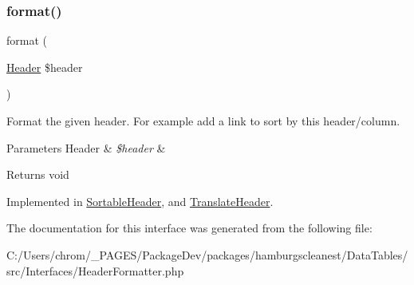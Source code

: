 \subsubsection{\texorpdfstring{format()}{format()}}
{\footnotesize\ttfamily format (\begin{DoxyParamCaption}\item[{\hyperlink{classhamburgscleanest_1_1_data_tables_1_1_models_1_1_header}{Header}}]{\$header }\end{DoxyParamCaption})}

Format the given header. For example add a link to sort by this header/column.


\begin{DoxyParams}[1]{Parameters}
Header & {\em \$header} & \\
\hline
\end{DoxyParams}
\begin{DoxyReturn}{Returns}
void 
\end{DoxyReturn}


Implemented in \hyperlink{classhamburgscleanest_1_1_data_tables_1_1_models_1_1_header_formatters_1_1_sortable_header_aa5aeddf9c056d9583b29322f75f70f82}{Sortable\+Header}, and \hyperlink{classhamburgscleanest_1_1_data_tables_1_1_models_1_1_header_formatters_1_1_translate_header_aa5aeddf9c056d9583b29322f75f70f82}{Translate\+Header}.



The documentation for this interface was generated from the following file\+:\begin{DoxyCompactItemize}
\item 
C\+:/\+Users/chrom/\+\_\+\+P\+A\+G\+E\+S/\+Package\+Dev/packages/hamburgscleanest/\+Data\+Tables/src/\+Interfaces/Header\+Formatter.\+php\end{DoxyCompactItemize}
